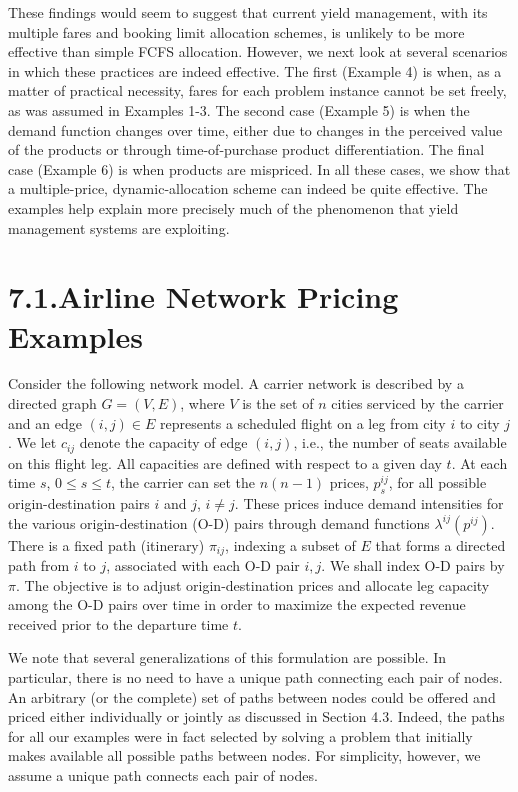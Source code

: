 These findings would seem to suggest that current yield management, with its multiple fares and booking limit allocation schemes, is unlikely to be more effective than simple FCFS allocation. However, we next look at several scenarios in which these practices are indeed effective. The first (Example 4) is when, as a matter of practical necessity, fares for each problem instance cannot be set freely, as was assumed in Examples 1-3. The second case (Example 5) is when the demand function changes over time, either due to changes in the perceived value of the products or through time-of-purchase product differentiation. The final case (Example 6) is when products are mispriced. In all these cases, we show that a multiple-price, dynamic-allocation scheme can indeed be quite effective. The examples help explain more precisely much of the phenomenon that yield management systems are exploiting.

\section{7.1.Airline Network Pricing Examples}\label{airline-network-pricing-examples}

Consider the following network model. A carrier network is described by a directed graph \(G = (V, E)\), where \(V\) is the set of \(n\) cities serviced by the carrier and an edge \((i, j) \in E\) represents a scheduled flight on a leg from city \(i\) to city \(j\). We let \(c_{ij}\) denote the capacity of edge \((i, j)\), i.e., the number of seats available on this flight leg. All capacities are defined with respect to a given day \(t\). At each time \(s\), \(0 \leqslant s \leqslant t\), the carrier can set the \(n(n - 1)\) prices, \(p_s^{ij}\), for all possible origin-destination pairs \(i\) and \(j\), \(i \neq j\). These prices induce demand intensities for the various origin-destination (O-D) pairs through demand functions \(\lambda^{ij} (p^{ij})\). There is a fixed path (itinerary) \(\pi_{ij}\), indexing a subset of \(E\) that forms a directed path from \(i\) to \(j\), associated with each O-D pair \(i, j\). We shall index O-D pairs by \(\pi\). The objective is to adjust origin-destination prices and allocate leg capacity among the O-D pairs over time in order to maximize the expected revenue received prior to the departure time \(t\).

We note that several generalizations of this formulation are possible. In particular, there is no need to have a unique path connecting each pair of nodes. An arbitrary (or the complete) set of paths between nodes could be offered and priced either individually or jointly as discussed in Section 4.3. Indeed, the paths for all our examples were in fact selected by solving a problem that initially makes available all possible paths between nodes. For simplicity, however, we assume a unique path connects each pair of nodes.

